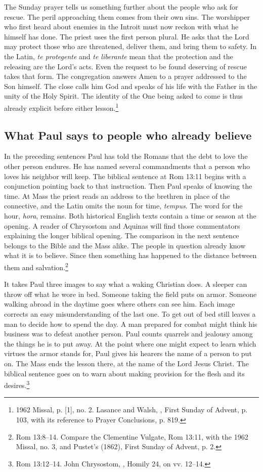 The Sunday prayer tells us something further about the people who ask for rescue. The peril approaching them comes from their own sins. The worshipper who first heard about enemies in the Introit must now reckon with what he himself has done. The priest uses the first person plural. He asks that the Lord may protect those who are threatened, deliver them, and bring them to safety. In the Latin, \emph{te protegente} and \emph{te liberante} mean that the protection and the releasing are the Lord's acts. Even the request to be found deserving of rescue takes that form. The congregation answers Amen to a prayer addressed to the Son himself. The close calls him God and speaks of his life with the Father in the unity of the Holy Spirit. The identity of the One being asked to come is thus already explicit before either lesson.\footnote{1962 Missal, p. [1], no. 2. Lasance and Walsh, , First Sunday of Advent, p. 103, with its reference to Prayer Conclusions, p. 819.}

\subsection{What Paul says to people who already believe}

In the preceding sentences Paul has told the Romans that the debt to love the other person endures. He has named several commandments that a person who loves his neighbor will keep. The biblical sentence at Rom 13:11 begins with a conjunction pointing back to that instruction. Then Paul speaks of knowing the time. At Mass the priest reads an address to the brethren in place of the connective, and the Latin omits the noun for time, \emph{tempus}. The word for the hour, \emph{hora}, remains. Both historical English texts contain a time or season at the opening. A reader of Chrysostom and Aquinas will find those commentators explaining the longer biblical opening. The comparison in the next sentence belongs to the Bible and the Mass alike. The people in question already know what it is to believe. Since then something has happened to the distance between them and salvation.\footnote{Rom 13:8--14. Compare the Clementine Vulgate, Rom 13:11, with the 1962 Missal, no. 3, and Pustet's  (1862), First Sunday of Advent, p. 2.}

It takes Paul three images to say what a waking Christian does. A sleeper can throw off what he wore in bed. Someone taking the field puts on armor. Someone walking abroad in the daytime goes where others can see him. Each image corrects an easy misunderstanding of the last one. To get out of bed still leaves a man to decide how to spend the day. A man prepared for combat might think his business was to defeat another person. Paul counts quarrels and jealousy among the things he is to put away. At the point where one might expect to learn which virtues the armor stands for, Paul gives his hearers the name of a person to put on. The Mass ends the lesson there, at the name of the Lord Jesus Christ. The biblical sentence goes on to warn about making provision for the flesh and its desires.\footnote{Rom 13:12--14. John Chrysostom, , Homily 24, on vv. 12--14.}

